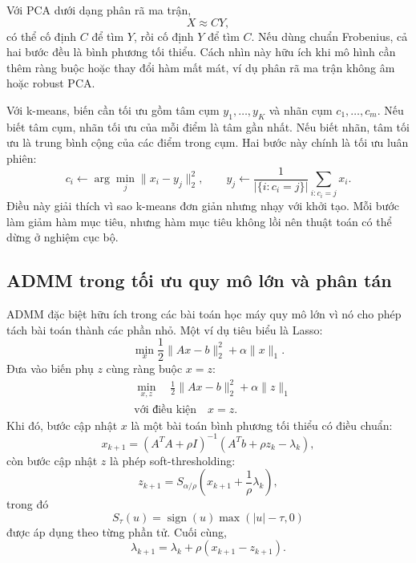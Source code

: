 Với PCA dưới dạng phân rã ma trận,
\begin{equation}
    X\approx CY,
    \label{eq_ml_pca_factor}
\end{equation}
có thể cố định $C$ để tìm $Y$, rồi cố định $Y$ để tìm $C$. Nếu dùng chuẩn Frobenius, cả hai bước đều là bình phương tối thiểu. Cách nhìn này hữu ích khi mô hình cần thêm ràng buộc hoặc thay đổi hàm mất mát, ví dụ phân rã ma trận không âm hoặc robust PCA.
\medskip

Với k-means, biến cần tối ưu gồm tâm cụm $y_1,\dots,y_K$ và nhãn cụm $c_1,\dots,c_m$. Nếu biết tâm cụm, nhãn tối ưu của mỗi điểm là tâm gần nhất. Nếu biết nhãn, tâm tối ưu là trung bình cộng của các điểm trong cụm. Hai bước này chính là tối ưu luân phiên:
\begin{equation}
    c_i\leftarrow \arg\min_j\|x_i-y_j\|_2^2,
    \qquad
    y_j\leftarrow \frac{1}{|\{i:c_i=j\}|}\sum_{i:c_i=j}x_i.
    \label{eq_ml_kmeans_two_steps}
\end{equation}
Điều này giải thích vì sao k-means đơn giản nhưng nhạy với khởi tạo. Mỗi bước làm giảm hàm mục tiêu, nhưng hàm mục tiêu không lồi nên thuật toán có thể dừng ở nghiệm cục bộ.

\subsection{ADMM trong tối ưu quy mô lớn và phân tán}
\label{SUB_SEC_ml_admm}
ADMM đặc biệt hữu ích trong các bài toán học máy quy mô lớn vì nó cho phép tách bài toán thành các phần nhỏ. Một ví dụ tiêu biểu là Lasso:
\begin{equation}
    \min_x
    \frac{1}{2}\|Ax-b\|_2^2+\alpha\|x\|_1.
    \label{eq_lasso_admm_original}
\end{equation}
Đưa vào biến phụ $z$ cùng ràng buộc $x=z$:
\begin{equation}
    \begin{aligned}
        &\min_{x,z}
        \quad
        \frac{1}{2}\|Ax-b\|_2^2+\alpha\|z\|_1\\
        &\text{với điều kiện}
        \quad
        x=z.
    \end{aligned}
    \label{eq_lasso_admm_split}
\end{equation}
Khi đó, bước cập nhật $x$ là một bài toán bình phương tối thiểu có điều chuẩn:
\begin{equation}
    x_{k+1}
    =
    (A^{T}A+\rho I)^{-1}
    \left(A^{T}b+\rho z_k-\lambda_k\right),
    \label{eq_lasso_admm_x}
\end{equation}
còn bước cập nhật $z$ là phép soft-thresholding:
\begin{equation}
    z_{k+1}
    =
    S_{\alpha/\rho}
    \left(x_{k+1}+\frac{1}{\rho}\lambda_k\right),
    \label{eq_lasso_admm_z}
\end{equation}
trong đó
\begin{equation}
    S_{\tau}(u)
    =
    \operatorname{sign}(u)\max(|u|-\tau,0)
    \label{eq_soft_threshold}
\end{equation}
được áp dụng theo từng phần tử. Cuối cùng,
\begin{equation}
    \lambda_{k+1}
    =
    \lambda_k+\rho(x_{k+1}-z_{k+1}).
    \label{eq_lasso_admm_lambda}
\end{equation}
\medskip

